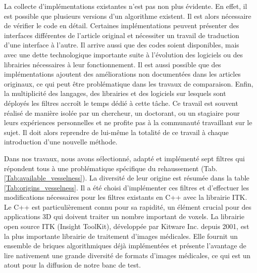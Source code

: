 La collecte d'implémentations existantes n'est pas non plus évidente. En effet, il est possible que plusieurs versions d'un algorithme existent. Il est alors nécessaire de vérifier le code en détail. Certaines implémentations peuvent présenter des interfaces différentes de l'article original et nécessiter un travail de traduction d'une interface à l'autre. Il arrive aussi que des codes soient disponibles, mais avec une dette technologique importante suite à l'évolution des logiciels ou des librairies nécessaires à leur fonctionnement. Il est aussi possible que des implémentations ajoutent des améliorations non documentées dans les articles originaux, ce qui peut être problématique dans les travaux de comparaison. Enfin, la multiplicité des langages, des librairies et des logiciels sur lesquels sont déployés les filtres accroît le temps dédié à cette tâche. Ce travail est souvent réalisé de manière isolée par un chercheur, un doctorant, ou un stagiaire pour leurs expériences personnelles et ne profite pas à la communauté travaillant sur le sujet. Il doit alors reprendre de lui-même la totalité de ce travail à chaque introduction d'une nouvelle méthode.

Dans nos travaux, nous avons sélectionné, adapté et implémenté sept filtres qui répondent tous à une problématique spécifique du rehaussement (Tab. \ref{Tab:available_vesselness}). La diversité de leur origine est résumée dans la table \ref{Tab:origins_vesselness}. Il a été choisi d'implémenter ces filtres et d'effectuer les modifications nécessaires pour les filtres existants en C++ avec la librairie ITK. Le C++ est particulièrement connu pour sa rapidité, un élément crucial pour des applications 3D qui doivent traiter un nombre important de voxels. La librairie open source ITK (Insight ToolKit), développée par Kitware Inc. depuis 2001, est la plus importante librairie de traitement d'images médicales. Elle fournit un ensemble de briques algorithmiques déjà implémentées et présente l'avantage de lire nativement une grande diversité de formats d'images médicales, ce qui est un atout pour la diffusion de notre banc de test.

